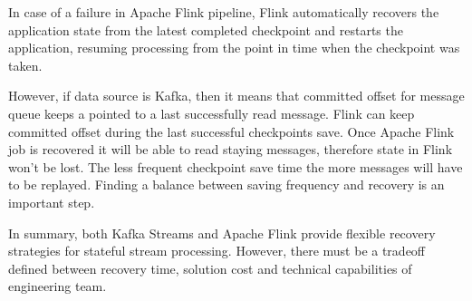 \begin{description}
    In case of a failure in Apache Flink pipeline, Flink automatically recovers the application
    state from the latest completed checkpoint and restarts the application,
    resuming processing from the point in time when the checkpoint was taken.

    However, if data source is Kafka, then it means that committed offset for message queue
    keeps a pointed to a last successfully read message.
    Flink can keep committed offset during the last successful checkpoints save.
    Once Apache Flink job is recovered it will be able to read staying messages,
    therefore state in Flink won't be lost.
    The less frequent checkpoint save time the more messages will have to be replayed.
    Finding a balance between saving frequency and recovery is an important step.

\end{description}

In summary, both Kafka Streams and Apache Flink provide flexible recovery strategies
for stateful stream processing.
However, there must be a tradeoff defined between recovery time, solution cost and
technical capabilities of engineering team.
